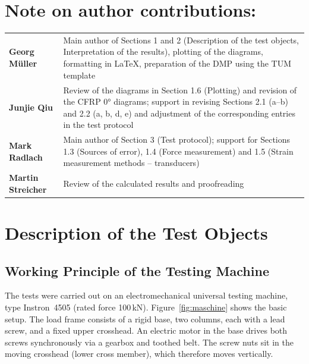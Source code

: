 \documentclass[11pt,a4paper]{article}
\begin{document}
\vspace{\baselineskip}

\section*{\small Note on author contributions:}
\begingroup
\small
\begin{tabular}{@{} l p{10cm} @{}}
    \textbf{Georg Müller} & Main author of Sections 1 and 2 (Description of the test objects, Interpretation of the results), plotting of the diagrams, formatting in LaTeX, preparation of the DMP using the TUM template \\
    [1ex]
    \textbf{Junjie Qiu} & Review of the diagrams in Section 1.6 (Plotting) and revision of the CFRP 0° diagrams; support in revising Sections 2.1 (a--b) and 2.2 (a, b, d, e) and adjustment of the corresponding entries in the test protocol \\
    [1ex]
    \textbf{Mark Radlach} & Main author of Section 3 (Test protocol); support for Sections 1.3 (Sources of error), 1.4 (Force measurement) and 1.5 (Strain measurement methods -- transducers) \\
    [1ex]
    \textbf{Martin Streicher} & Review of the calculated results and proofreading \\
\end{tabular}
\endgroup

\newpage

\section{Description of the Test Objects}

\subsection{Working Principle of the Testing Machine}

The tests were carried out on an electromechanical universal testing machine,
type Instron~4505 (rated force 100\,kN). Figure~\ref{fig:maschine} shows the
basic setup. The load frame consists of a rigid base, two columns, each with a
lead screw, and a fixed upper crosshead. An electric motor in the base drives
both screws synchronously via a gearbox and toothed belt. The screw nuts sit in
the moving crosshead (lower cross member), which therefore moves vertically.
\end{document}
